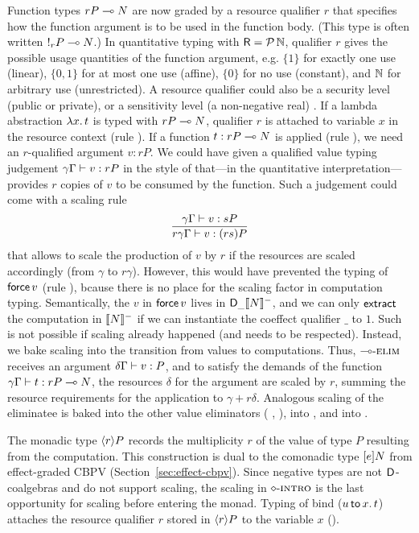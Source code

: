 \documentclass[acmsmall,review,anonymous]{acmart}\settopmatter{printfolios=true,printccs=false,printacmref=false}
\theoremstyle{remark}
\begin{document}
Function types $\qfun r P N$ are now graded by a resource qualifier
$r$ that specifies how the function argument is to be used in the
function body.  (This type is often written $!_{r}P \lolli N$.)  In
quantitative typing with $\R = \Pot \bN$, qualifier $r$ gives the
possible usage quantities of the function argument, e.g. $\{1\}$ for
exactly one use (linear), $\{0,1\}$ for at most one use (affine),
$\{0\}$ for no use (constant), and $\bN$ for arbitrary use
(unrestricted).  A resource qualifier could also be a security level
(public or private), or a sensitivity level (a non-negative real)
\citep{reedPierce:icfp10}.  If a lambda abstraction $\lam x t$ is
typed with $\qfun r P N$, qualifier $r$ is attached to variable $x$ in
the resource context (rule \rintro\lolli).  If a function
$t : \qfun r P N$ is applied (rule \relim\lolli), we need an
$r$-qualified argument $v : rP$.  We could have given a qualified
value typing judgement $\qValTy \gamma \Gamma v {rP}$ in the style of
\citet{mcBride:wadler60} that---in the quantitative
interpretation---provides $r$ copies of $v$ to be consumed by the
function.  Such a judgement could come with a scaling rule
\[
\ru{\qValTy \gamma \Gamma v {sP}
  }{\qValTy{r\gamma}\Gamma v {(rs)P}}
\]
that allows to scale the production of $v$ by $r$ if the resources are
scaled accordingly (from $\gamma$ to $r\gamma$).
%
However, this would have prevented the typing of $\force v$ (rule
\relim\Box), bcause there is no place for the scaling factor in
computation typing.  Semantically, the $v$ in $\force v$
lives in $\D[\_]\denn N$, and
we can only $\textract$ the computation in $\denn N$ if we can
instantiate the coeffect qualifier $\_$ to $1$.  Such is not possible
if scaling already happened (and needs to be respected).
%
Instead, we bake scaling
into the transition from values to computations.
Thus, $\relim\lolli$ receives an
argument $\qValTy \delta \Gamma v P$, and to satisfy the demands of
the function $\qCompTy \gamma \Gamma t {\qfun r P N}$, the resources
$\delta$ for the argument are scaled by $r$, summing the resource
requirements for the application to $\gamma + r\delta$.
%
Analogous scaling of the eliminatee is baked into the other value
eliminators (%
\relim\GS, \relim\otimes), into %
 \rlet,
and into \rintro\diamond.

The monadic type $\compty r P$ records the multiplicity $r$ of the
value of type $P$ resulting from the computation.  This construction
is dual to the comonadic type $\thunkty e N$ from effect-graded CBPV
(Section~\ref{sec:effect-cbpv}).  Since negative types are not
$\D$-coalgebras and do not support scaling, the scaling in
$\rintro\diamond$ is the last opportunity for scaling before entering
the monad.
Typing of bind ($\bind x u t$) attaches the resource qualifier $r$
stored in $\compty r P$ to the variable $x$ (\relim\diamond).
\end{document}
